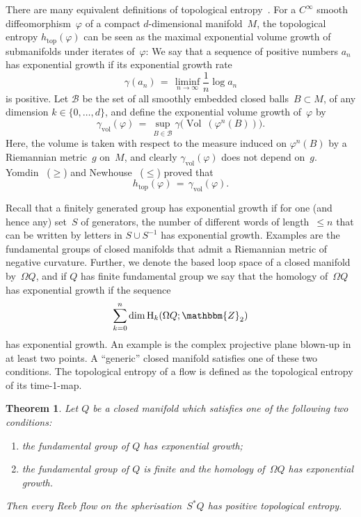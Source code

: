 \documentclass[12pt,twoside]{amsart}
\theoremstyle{plain}
\newtheorem{theorem}{Theorem}[section]
\numberwithin{figure}{section}
\numberwithin{equation}{section}
\def\Vol{\operatorname {Vol}\:\!}
\def\top{\operatorname{top}}
\def\vol{\operatorname{vol}}
\def\H{\operatorname{H}}
\def\gg{\gamma}
\def\gf{\varphi}
\def\cb{{\mathcal B}}
\def\ZZ{\mathbbm{Z}}
\begin{document}
There are many equivalent definitions of topological entropy~\cite[\S 3.1]{HaKa95}.
For a $C^\infty$ smooth diffeomorphism~$\gf$ of a compact $d$-dimensional manifold~$M$,
the topological entropy $h_{\top}(\gf)$ can be seen as the maximal exponential volume growth of
submanifolds under iterates of~$\gf$:  
%
We say that a sequence of positive numbers $a_n$ has exponential growth if its exponential growth rate 
$$
\gamma (a_n) \,=\, \liminf_{n \to \infty} \frac 1n \log a_n 
$$
is positive. 
% 
Let $\cb$ be the set of all smoothly embedded closed balls~$B \subset M$, of any dimension $k \in \{0, \dots, d\}$,
and define the exponential volume growth of~$\gf$ by
$$
\gg_{\vol} (\gf) \,=\,  \sup_{B \in \cb} \gg \bigl( \Vol (\gf^n (B)) \bigr) .
$$
Here, the volume is taken with respect to the measure induced on $\gf^n(B)$ by a Riemannian 
metric~$g$ on~$M$, and clearly $\gg_{\vol} (\gf)$ does not depend on~$g$.
%
Yomdin~\cite{Yom87} ($\geqslant$) and Newhouse~\cite{New88} ($\leqslant$) proved that 
%
\begin{equation} \label{e:Yomdin}
h_{\top}(\gf) \,=\, \gg_{\vol} (\gf) .
\end{equation}

Recall that a finitely generated group has exponential growth if for one (and hence any)
set~$S$ of generators, the number of different words of length~$\leqslant n$
that can be written by letters in $S \cup S^{-1}$ has exponential growth.
Examples are the fundamental groups of closed manifolds that admit a Riemannian metric of negative 
curvature.
%
Further, we denote the based loop space of a closed manifold by~$\Omega Q$, 
and if $Q$ has finite fundamental group 
we say that the homology of~$\Omega Q$ has exponential growth 
if the sequence
\begin{equation} \label{e:expOmega}
\sum_{k=0}^n \dim \H_k (\Omega Q; \ZZ_2)
\end{equation}
has exponential growth. An example is the complex projective plane blown-up in at least two points. 
A ``generic'' closed manifold satisfies one of these two conditions.
The topological entropy of a flow is defined as the topological entropy of its time-1-map.

\begin{theorem} \label{t:htop}
Let $Q$ be a closed manifold which satisfies one of the following two conditions:
\begin{enumerate}[\rm (i)]
\item the fundamental group of $Q$ has exponential growth;
\item the fundamental group of $Q$ is finite and the homology of~$\Omega Q$ 
has exponential growth. 
\end{enumerate}
%
Then every Reeb flow on the spherisation~$S^*Q$ has positive topological entropy. 
\end{theorem}
\end{document}
